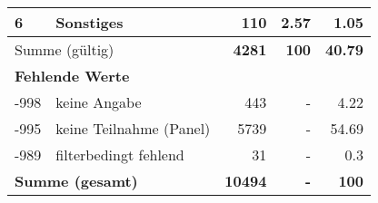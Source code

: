 \begin{longtable}{lXrrr}
     6 &
     \multicolumn{1}{X}{ Sonstiges   } &


       \num{110} &
       \num[round-mode=places,round-precision=2]{2.57} &
         \num[round-mode=places,round-precision=2]{1.05} \\
     \midrule
     \multicolumn{2}{l}{Summe (gültig)} &
       \textbf{\num{4281}} &
     \textbf{\num{100}} &
       \textbf{\num[round-mode=places,round-precision=2]{40.79}} \\
     \multicolumn{5}{l}{\textbf{Fehlende Werte}}\\
       -998 &
       keine Angabe &
         \num{443} &
        - &
         \num[round-mode=places,round-precision=2]{4.22} \\
       -995 &
       keine Teilnahme (Panel) &
         \num{5739} &
        - &
         \num[round-mode=places,round-precision=2]{54.69} \\
       -989 &
       filterbedingt fehlend &
         \num{31} &
        - &
         \num[round-mode=places,round-precision=2]{0.3} \\
     \midrule
     \multicolumn{2}{l}{\textbf{Summe (gesamt)}} &
          \textbf{\num{10494}} &
        \textbf{-} &
        \textbf{\num{100}} \\
     \bottomrule
     \end{longtable}
     

